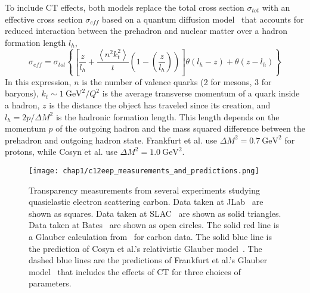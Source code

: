 To include CT effects, both models replace the total cross section
$\sigma_{tot}$ with an effective cross section $\sigma_{eff}$
based on a quantum diffusion model~\cite{Farrar_1988}
that accounts for reduced interaction between the prehadron and nuclear matter
over a hadron formation length $l_h$,
\begin{equation}
    \sigma_{eff} = \sigma_{tot}
    \left\{
        \left[\frac{z}{l_h} +
               \frac{\left\langle n^{2} k_{t}^{2}\right\rangle}{t} \left(1-\left(\frac{z}{l_h}\right)\right)
        \right]
        \theta\left(l_h-z\right) +
        \theta\left(z-l_h\right)
    \right\}
\end{equation}
In this expression,
$n$ is the number of valence quarks (2 for mesons, 3 for baryons),
$k_t \sim \SI{1}{\giga\electronvolt\squared}/Q^2$
is the average transverse momentum of a quark inside a hadron,
$z$ is the distance the object has traveled since its creation,
and
$l_h=2p/\Delta M^2$ is the hadronic formation length.
This length depends on
the momentum $p$ of the outgoing hadron
and
the mass squared difference between the prehadron and outgoing hadron state.
Frankfurt et al. use $\Delta M^2 = \SI{0.7}{\giga\electronvolt\squared}$
for protons, while
Cosyn et al. use $\Delta M^2 = \SI{1.0}{\giga\electronvolt\squared}$.

\begin{figure}[!h]
    \centering
    \texttt{[image: chap1/c12eep\_measurements\_and\_predictions.png]}
    \caption[Transparency measurements from several experiments studying
             quasielastic electron scattering carbon.]{Transparency measurements from several experiments studying
             quasielastic electron scattering carbon.
             Data taken at JLab~\cite{Abbot_1998, Garrow_2002, Rohe_2005} are shown as squares.
             Data taken at SLAC~\cite{Makins_1994, ONeill_1995} are shown as solid triangles.
             Data taken at Bates~\cite{Garino_1992} are shown as open circles.
             The solid red line is a Glauber calculation from~\cite{Pandharipande_1992} for carbon data.
             The solid blue line is the prediction of Cosyn et al.'s
             relativistic Glauber model~\cite{Cosyn_2006, Cosyn_2008}.
             The dashed blue lines are the predictions of Frankfurt et al.'s
             Glauber model~\cite{Frankfurt_1995_PRC} that includes the effects of CT for three choices of
             parameters.
            }
    \label{fig:c12eep_transparency_intro}
\end{figure}


